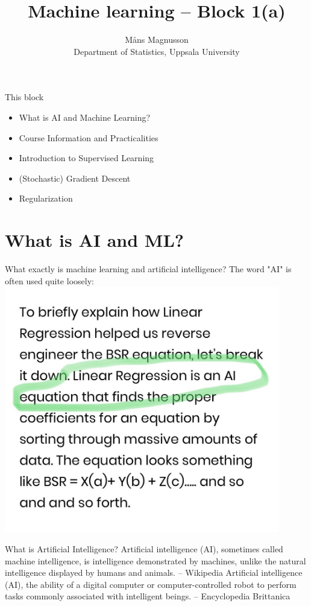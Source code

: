 \documentclass[10pt]{beamer}
\title[]{{\color{black}Machine learning -- Block 1(a)}}
\author[]{M{\aa}ns Magnusson\\Department of Statistics, Uppsala University}
\date{\currentsemester}
\begin{document}
\frame{\titlepage
}



\begin{frame}{This block}
\begin{itemize}
\item What is AI and Machine Learning?
\item Course Information and Practicalities
\item Introduction to Supervised Learning
\item (Stochastic) Gradient Descent
\item Regularization
\end{itemize}
\end{frame}

\section{What is AI and ML?}
\frame{\sectionpage}

\begin{frame}{What exactly is machine learning and artificial intelligence?}
The word "AI" is often used quite loosely:
   \includegraphics[width=0.9\textwidth]{figs/AI-example.jpg}
\end{frame}


\begin{frame}{What is Artificial Intelligence?}
Artificial intelligence (AI), sometimes called machine intelligence, is intelligence demonstrated by machines, unlike the natural intelligence displayed by humans and animals. -- Wikipedia
\pause
Artificial intelligence (AI), the ability of a digital computer or computer-controlled robot to perform tasks commonly associated with intelligent beings. -- Encyclopedia Brittanica
\end{frame}
\end{document}
